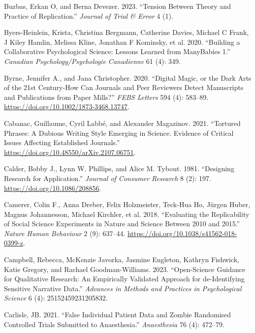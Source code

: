 \documentclass[
  letterpaper,
  DIV=11,
  numbers=noendperiod]{scrreprt}
\newlength{\cslhangindent}
\newenvironment{CSLReferences}[2] %
 {\begin{list}{}{%
  \setlength{\itemindent}{0pt}
  \setlength{\leftmargin}{0pt}
  \setlength{\parsep}{0pt}
  \ifodd #1
   \setlength{\leftmargin}{\cslhangindent}
   \setlength{\itemindent}{-1\cslhangindent}
  \fi
  \setlength{\itemsep}{#2\baselineskip}}}
 {\end{list}}
\begin{document}
\begin{CSLReferences}{1}{0}
Buzbas, Erkan O, and Berna Devezer. 2023. {``Tension Between Theory and
Practice of Replication.''} \emph{Journal of Trial \& Error} 4 (1).

Byers-Heinlein, Krista, Christina Bergmann, Catherine Davies, Michael C
Frank, J Kiley Hamlin, Melissa Kline, Jonathan F Kominsky, et al. 2020.
{``Building a Collaborative Psychological Science: Lessons Learned from
ManyBabies 1.''} \emph{Canadian Psychology/Psychologie Canadienne} 61
(4): 349.

Byrne, Jennifer A., and Jana Christopher. 2020. {``Digital Magic, or the
Dark Arts of the 21st Century-How Can Journals and Peer Reviewers Detect
Manuscripts and Publications from Paper Mills?''} \emph{FEBS Letters}
594 (4): 583--89. \url{https://doi.org/10.1002/1873-3468.13747}.

Cabanac, Guillaume, Cyril Labbé, and Alexander Magazinov. 2021.
{``Tortured Phrases: A Dubious Writing Style Emerging in Science.
Evidence of Critical Issues Affecting Established Journals.''}
\url{https://doi.org/10.48550/arXiv.2107.06751}.

Calder, Bobby J., Lynn W. Phillips, and Alice M. Tybout. 1981.
{``Designing Research for Application.''} \emph{Journal of Consumer
Research} 8 (2): 197. \url{https://doi.org/10.1086/208856}.

Camerer, Colin F., Anna Dreber, Felix Holzmeister, Teck-Hua Ho, Jürgen
Huber, Magnus Johannesson, Michael Kirchler, et al. 2018. {``Evaluating
the Replicability of Social Science Experiments in Nature and Science
Between 2010 and 2015.''} \emph{Nature Human Behaviour} 2 (9): 637--44.
\url{https://doi.org/10.1038/s41562-018-0399-z}.

Campbell, Rebecca, McKenzie Javorka, Jasmine Engleton, Kathryn Fishwick,
Katie Gregory, and Rachael Goodman-Williams. 2023. {``Open-Science
Guidance for Qualitative Research: An Empirically Validated Approach for
de-Identifying Sensitive Narrative Data.''} \emph{Advances in Methods
and Practices in Psychological Science} 6 (4): 25152459231205832.

Carlisle, JB. 2021. {``False Individual Patient Data and Zombie
Randomised Controlled Trials Submitted to Anaesthesia.''}
\emph{Anaesthesia} 76 (4): 472--79.


\end{CSLReferences}
\end{document}

